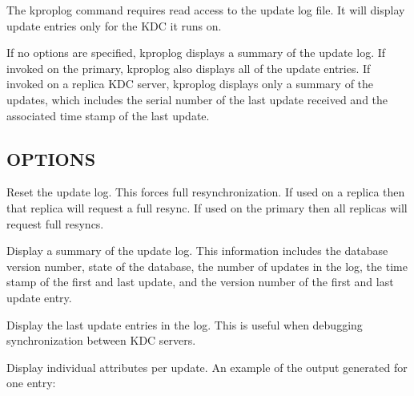 \documentclass[letterpaper,10pt,english]{sphinxmanual}
\begin{document}
\sphinxAtStartPar
The kproplog command requires read access to the update log file.  It
will display update entries only for the KDC it runs on.

\sphinxAtStartPar
If no options are specified, kproplog displays a summary of the update
log.  If invoked on the primary, kproplog also displays all of the
update entries.  If invoked on a replica KDC server, kproplog displays
only a summary of the updates, which includes the serial number of the
last update received and the associated time stamp of the last update.


\subsection{OPTIONS}
\label{\detokenize{admin/admin_commands/kproplog:options}}\begin{description}
\sphinxAtStartPar
Reset the update log.  This forces full resynchronization.  If
used on a replica then that replica will request a full resync.
If used on the primary then all replicas will request full
resyncs.

\sphinxAtStartPar
Display a summary of the update log.  This information includes
the database version number, state of the database, the number of
updates in the log, the time stamp of the first and last update,
and the version number of the first and last update entry.

\sphinxAtStartPar
Display the last  update entries in the log.  This is useful
when debugging synchronization between KDC servers.

\sphinxAtStartPar
Display individual attributes per update.  An example of the
output generated for one entry:

\begin{sphinxVerbatim}[commandchars=\\\{\}]
 
     
      
      
      
      
           
      
          
           
          
          
          
\end{sphinxVerbatim}

\end{description}
\end{document}
